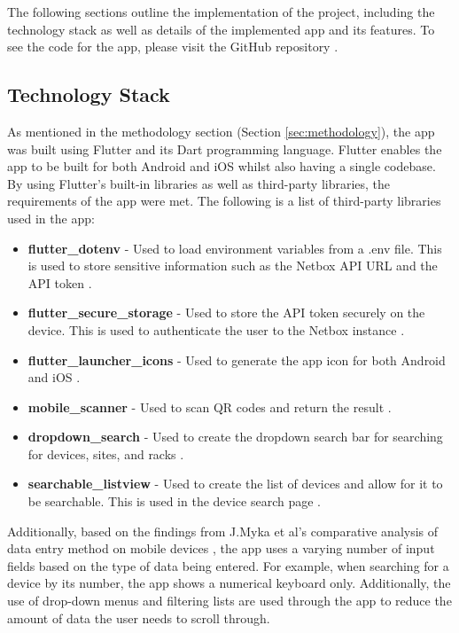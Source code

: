 \documentclass [11pt,a4paper]{article}
\begin{document}
The following sections outline the implementation of the project, including the technology stack as well as details of the implemented app and its features. To see the code for the app, please visit the GitHub repository \cite{keeptrackgithub}.

\subsection{Technology Stack}
\label{sec:technologies}

As mentioned in the methodology section (Section \ref{sec:methodology}), the app was built using Flutter and its Dart programming language. Flutter enables the app to be built for both Android and iOS whilst also having a single codebase. By using Flutter's built-in libraries as well as third-party libraries, the requirements of the app were met. The following is a list of third-party libraries used in the app:
\begin{itemize}
    \item \textbf{flutter\_dotenv} - Used to load environment variables from a .env file. This is used to store sensitive information such as the Netbox API URL and the API token \cite{dot_env}.
    \item \textbf{flutter\_secure\_storage} - Used to store the API token securely on the device. This is used to authenticate the user to the Netbox instance \cite{secure_sec}.
    \item \textbf{flutter\_launcher\_icons} - Used to generate the app icon for both Android and iOS \cite{icon_launch}.
    \item \textbf{mobile\_scanner} - Used to scan QR codes and return the result \cite{barcodeScannerPlugin}.
    \item \textbf{dropdown\_search} - Used to create the dropdown search bar for searching for devices, sites, and racks \cite{dropdown}.
    \item \textbf{searchable\_listview} - Used to create the list of devices and allow for it to be searchable. This is used in the device search page \cite{searchable}. 
\end{itemize}

Additionally, based on the findings from J.Myka et al's comparative analysis of data entry method on mobile devices \cite{myka2019comparative}, the app uses a varying number of input fields based on the type of data being entered. For example, when searching for a device by its number, the app shows a numerical keyboard only. Additionally, the use of drop-down menus and filtering lists are used through the app to reduce the amount of data the user needs to scroll through.
\end{document}
